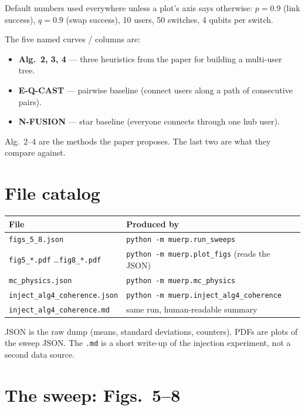 \documentclass[11pt]{article}
\begin{document}
Default numbers used everywhere unless a plot's axis says otherwise:
$p = 0.9$ (link success), $q = 0.9$ (swap success), 10 users, 50 switches, 4 qubits per switch.

The five named curves / columns are:

\begin{itemize}
\item \textbf{Alg.~2, 3, 4} --- three heuristics from the paper for building a multi-user tree.
\item \textbf{E-Q-CAST} --- pairwise baseline (connect users along a path of consecutive pairs).
\item \textbf{N-FUSION} --- star baseline (everyone connects through one hub user).
\end{itemize}

Alg.~2--4 are the methods the paper proposes. The last two are what they compare against.

\section{File catalog}

\begin{center}
\begin{tabular}{@{}ll@{}}
\toprule
File & Produced by \\
\midrule
\texttt{figs\_5\_8.json} & \texttt{python -m muerp.run\_sweeps} \\
\texttt{fig5\_*.pdf} \ldots \texttt{fig8\_*.pdf} & \texttt{python -m muerp.plot\_figs} (reads the JSON) \\
\texttt{mc\_physics.json} & \texttt{python -m muerp.mc\_physics} \\
\texttt{inject\_alg4\_coherence.json} & \texttt{python -m muerp.inject\_alg4\_coherence} \\
\texttt{inject\_alg4\_coherence.md} & same run, human-readable summary \\
\bottomrule
\end{tabular}
\end{center}

JSON is the raw dump (means, standard deviations, counters).
PDFs are plots of the sweep JSON.
The \texttt{.md} is a short write-up of the injection experiment, not a second data source.

\section{The sweep: Figs.~5--8}
\end{document}
